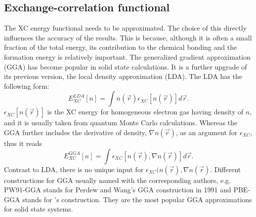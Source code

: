 \subsection{Exchange-correlation functional}
The XC energy functional needs to be approximated. The choice of this directly influences the accuracy of the results. This is because, although it is often a small fraction of the total energy, its contribution to the chemical bonding and the formation energy is relatively important. The generalized gradient approximation (GGA) has become popular in solid state calculations. It is a further upgrade of its previous version, the local density approximation (LDA). The LDA has the following form:
\begin{equation}
E_{XC}^{LDA}[n]=\int n(\vec{r})\epsilon_{XC}[n(\vec{r})]d\vec{r}.
\end{equation}
$\epsilon_{XC}[n(\vec{r})]$ is the XC energy for homogeneous electron gas having density of $n$, and it is usually taken from quantum Monte Carlo calculations. Whereas the GGA further includes the derivative of density, $\nabla n(\vec{r})$, as an argument for $\epsilon_{XC}$, thus it reads
\begin{equation}
E_{XC}^{GGA}[n]=\int \epsilon_{XC}[n(\vec{r}),\nabla n(\vec{r})]d\vec{r}.
\end{equation}
Contrast to LDA, there is no unique input for $\epsilon_{XC}(n(\vec{r}),\nabla n(\vec{r})$. Different constructions for GGA usually named with the corresponding authors, e.g. PW91-GGA stands for Perdew and Wang's GGA construction in 1991\cite{Perdew1991,Perdew1992} and PBE-GGA stands for \citet{Perdew1996}'s construction. They are the most popular GGA approximations for solid state systems. 
